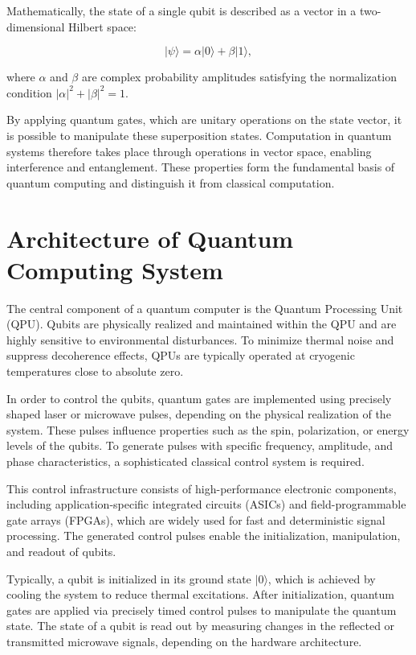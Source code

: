 \documentclass[12pt,a4paper]{article}
\begin{document}
Mathematically, the state of a single qubit is described as a vector in a two-dimensional Hilbert space:

\begin{equation}
    \lvert \psi \rangle = \alpha \lvert 0 \rangle + \beta \lvert 1 \rangle,
\end{equation}

where $\alpha$ and $\beta$ are complex probability amplitudes satisfying the normalization condition $|\alpha|^2 + |\beta|^2 = 1$.

By applying quantum gates, which are unitary operations on the state vector, 
it is possible to manipulate these superposition states. 
Computation in quantum systems therefore takes place through operations in vector space, 
enabling interference and entanglement. 
These properties form the fundamental basis of quantum computing 
and distinguish it from classical computation. \cite{IntroQuantumComputing}


\section{Architecture of Quantum Computing System}
The central component of a quantum computer is the Quantum Processing Unit (QPU). 
Qubits are physically realized and maintained within the QPU 
and are highly sensitive to environmental disturbances. 
To minimize thermal noise and suppress decoherence effects, 
QPUs are typically operated at cryogenic temperatures close to absolute zero.

In order to control the qubits, quantum gates are implemented 
using precisely shaped laser or microwave pulses, 
depending on the physical realization of the system. 
These pulses influence properties such as the spin, polarization, or energy levels of the qubits. 
To generate pulses with specific frequency, amplitude, and phase characteristics, 
a sophisticated classical control system is required.

This control infrastructure consists of high-performance electronic components, 
including application-specific integrated circuits (ASICs) and field-programmable gate arrays (FPGAs), 
which are widely used for fast and deterministic signal processing. 
The generated control pulses enable the initialization, manipulation, and readout of qubits.

Typically, a qubit is initialized in its ground state $\lvert 0 \rangle$, 
which is achieved by cooling the system to reduce thermal excitations. 
After initialization, quantum gates are applied via precisely timed control pulses to manipulate the quantum state. 
The state of a qubit is read out by measuring changes in the reflected 
or transmitted microwave signals, depending on the hardware architecture.
\end{document}
